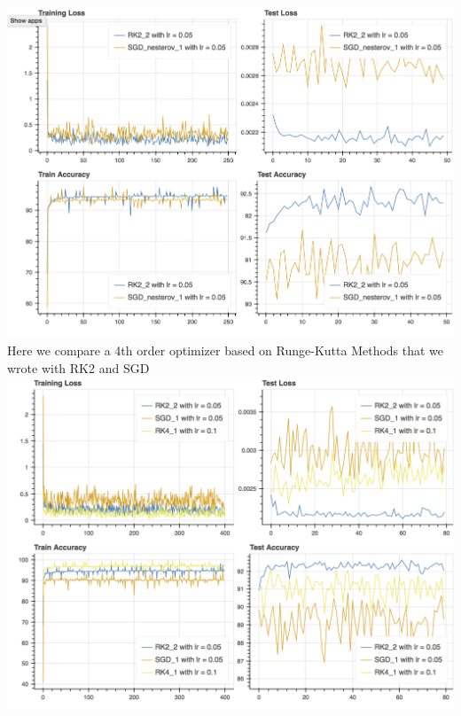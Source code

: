 \includegraphics[scale=0.4]{plots/plots_1/lasso_2.png}
\\
Here we compare a 4th order optimizer based on Runge-Kutta Methods that we wrote with RK2 and SGD
\\
\includegraphics[scale=0.4]{plots/plots_1/lasso_1.png}
\\
